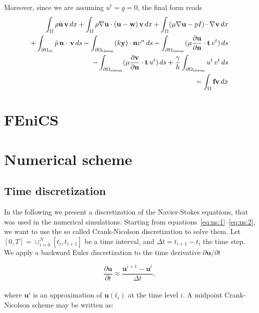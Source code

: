 \documentclass[11pt,a4paper,titlepage]{report}
\begin{document}
Moreover, since we are assuming $u^t = g = 0$, the final form reads
\begin{equation}
\begin{split}
 \int_{\Omega} \rho \dot{\mathbf{u}} \, \mathbf{v} \, dx
+ \int_{\Omega} \rho \nabla \mathbf{u} \cdot (\mathbf{u} - \mathbf{w}) \, \mathbf{v} \, dx
+ \int_{\Omega} (\mu \nabla \mathbf{u} - pI) \cdot \nabla \mathbf{v} \, dx \\
+ \int_{\partial \Omega_{\rm tb}} \bar{p} \, \mathbf{n} \cdot \, \mathbf{v} \, ds  %
- \int_{\partial \Omega_{\rm tissue}} (k \mathbf{y}) \cdot \mathbf{n} v^n \, ds 
- \int_{\partial \Omega_{\rm tissue}} (\mu \frac{\partial \mathbf{u}}{\partial \mathbf{n}} \cdot \mathbf{t} \, v^t) \, ds \\
- \int_{\partial \Omega_{\rm tissue}} (\mu \frac{\partial \mathbf{v}}{\partial \mathbf{n}} \cdot \mathbf{t} \, u^t) \, ds 
+ \frac{\gamma}{h} \int_{\partial \Omega_{\rm tissue}} u^t \, v^t \, ds \\
= \int_{\Omega} \mathbf{f} \mathbf{v} \, dx
\end{split}
\end{equation}


\section{FEniCS}

\section{Numerical scheme}

\subsection{Time discretization}
In the following we present a discretization of the Navier-Stokes equations, that was used in the numerical simulations. Starting from equations~\eqref{eq:ns:1}--\eqref{eq:ns:2}, we want to use the so called Crank-Nicolson discretization to solve them. Let $[0, T] = \cup^N_{i=0} [t_i, t_{i+1}] $ be a time interval, and $\Delta t = t_{i+1} - t_i$ the time step. We apply a backward Euler discretization to the time derivative $\partial \mathbf{u}/ \partial t$

\begin{equation}
\frac{\partial \mathbf{u}}{\partial t} \approx \frac{\mathbf{u}^{i+1} -\mathbf{u}^i }{\Delta t},
\end{equation}
\\
where $\mathbf{u}^i$ is an approximation of $\mathbf{u}(t_i)$ at the time level $i$. A midpoint Crank-Nicolson scheme may be written as:
\end{document}
